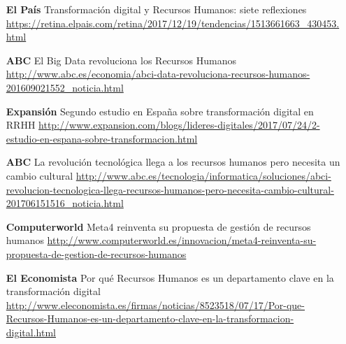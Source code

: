\begin{center}

\begin{minipage}{0.75\linewidth}
\begin{itemize}

\item[{\bf El País}] Transformación digital y Recursos Humanos: siete reflexiones \newline
\url{ https://retina.elpais.com/retina/2017/12/19/tendencias/1513661663_430453.html }
\item[{\bf ABC}] El Big Data revoluciona los Recursos Humanos \newline
\url{http://www.abc.es/economia/abci-data-revoluciona-recursos-humanos-201609021552_noticia.html }
\item[{\bf Expansión}] Segundo estudio en España sobre transformación digital en RRHH 
\newline \url{ http://www.expansion.com/blogs/lideres-digitales/2017/07/24/2-estudio-en-espana-sobre-transformacion.html }
\item[{\bf ABC}] La revolución tecnológica llega a los recursos humanos pero necesita un cambio cultural
\newline \url{ http://www.abc.es/tecnologia/informatica/soluciones/abci-revolucion-tecnologica-llega-recursos-humanos-pero-necesita-cambio-cultural-201706151516_noticia.html }
\item[{\bf Computerworld}] Meta4 reinventa su propuesta de gestión de recursos humanos\newline 
\url{ http://www.computerworld.es/innovacion/meta4-reinventa-su-propuesta-de-gestion-de-recursos-humanos }
\item[{\bf El Economista}] Por qué Recursos Humanos es un departamento clave en la transformación digital \newline
\url{ http://www.eleconomista.es/firmas/noticias/8523518/07/17/Por-que-Recursos-Humanos-es-un-departamento-clave-en-la-transformacion-digital.html }
\end{itemize}

\end{minipage}
\end{center}


